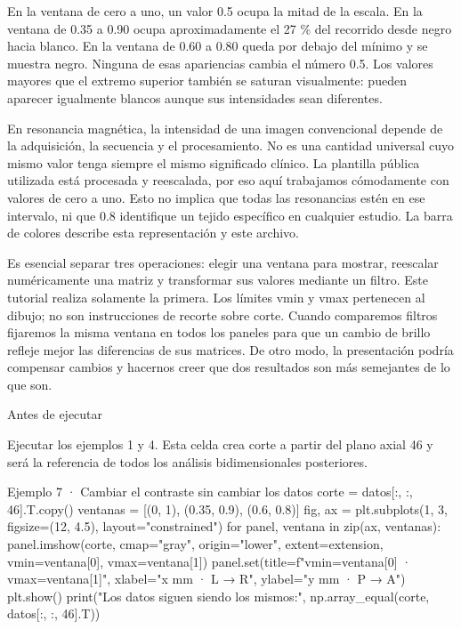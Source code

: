 En la ventana de cero a uno, un valor 0.5 ocupa la mitad de la escala. En la ventana de 0.35 a 0.90 ocupa aproximadamente el 27 \% del recorrido desde negro hacia blanco. En la ventana de 0.60 a 0.80 queda por debajo del mínimo y se muestra negro. Ninguna de esas apariencias cambia el número 0.5. Los valores mayores que el extremo superior también se saturan visualmente: pueden aparecer igualmente blancos aunque sus intensidades sean diferentes.


En resonancia magnética, la intensidad de una imagen convencional depende de la adquisición, la secuencia y el procesamiento. No es una cantidad universal cuyo mismo valor tenga siempre el mismo significado clínico. La plantilla pública utilizada está procesada y reescalada, por eso aquí trabajamos cómodamente con valores de cero a uno. Esto no implica que todas las resonancias estén en ese intervalo, ni que 0.8 identifique un tejido específico en cualquier estudio. La barra de colores describe esta representación y este archivo.


Es esencial separar tres operaciones: elegir una ventana para mostrar, reescalar numéricamente una matriz y transformar sus valores mediante un filtro. Este tutorial realiza solamente la primera. Los límites vmin y vmax pertenecen al dibujo; no son instrucciones de recorte sobre corte. Cuando comparemos filtros fijaremos la misma ventana en todos los paneles para que un cambio de brillo refleje mejor las diferencias de sus matrices. De otro modo, la presentación podría compensar cambios y hacernos creer que dos resultados son más semejantes de lo que son.



\begin{Idea}{Antes de ejecutar}

Ejecutar los ejemplos 1 y 4. Esta celda crea corte a partir del plano axial 46 y será la referencia de todos los análisis bidimensionales posteriores.


\end{Idea}

\begin{Codigo}{Ejemplo 7 · Cambiar el contraste sin cambiar los datos}
corte = datos[:, :, 46].T.copy()
ventanas = [(0, 1), (0.35, 0.9), (0.6, 0.8)]
fig, ax = plt.subplots(1, 3, figsize=(12, 4.5), layout="constrained")
for panel, ventana in zip(ax, ventanas):
    panel.imshow(corte, cmap="gray", origin="lower", extent=extension, vmin=ventana[0], vmax=ventana[1])
    panel.set(title=f"vmin={ventana[0]} · vmax={ventana[1]}", xlabel="x mm · L → R", ylabel="y mm · P → A")
plt.show()
print("Los datos siguen siendo los mismos:", np.array_equal(corte, datos[:, :, 46].T))
\end{Codigo}

